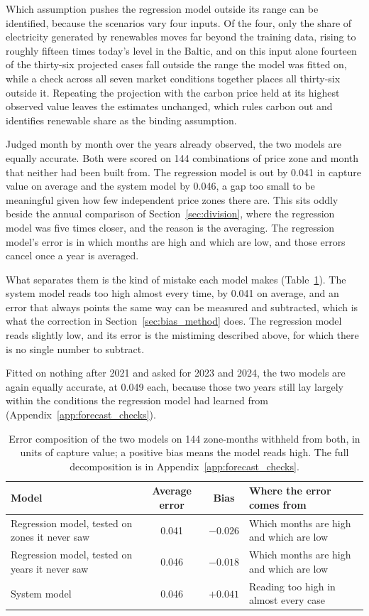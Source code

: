 Which assumption pushes the regression model outside its range can be
identified, because the scenarios vary four inputs. Of the four, only the
share of electricity generated by renewables moves far beyond the training
data, rising to roughly fifteen times today's level in the Baltic, and on this
input alone fourteen of the thirty-six projected cases fall outside the range
the model was fitted on, while a check across all seven market conditions
together places all thirty-six outside it. Repeating the projection with the
carbon price held at its highest observed value leaves the estimates
unchanged, which rules carbon out and identifies renewable share as the
binding assumption\label{sec:two_estimators}.

Judged month by month over the years already observed, the two models are
equally accurate. Both were scored on 144 combinations of price zone and month
that neither had been built from. The regression model is out by 0.041 in
capture value on average and the system model by 0.046, a gap too small to be
meaningful given how few independent price zones there are. This sits
oddly beside the annual comparison of Section~\ref{sec:division}, where the
regression model was five times closer, and the reason is the averaging. The
regression model's error is in which months are high and which are low, and
those errors cancel once a year is averaged.

What separates them is the kind of mistake each model makes
(Table~\ref{tab:skill}). The system model reads too high almost every time, by
0.041 on average, and an error that always points the same way can be measured
and subtracted, which is what the correction in Section~\ref{sec:bias_method}
does. The regression model reads slightly low, and its error is the mistiming
described above, for which there is no single number to subtract.

Fitted on nothing after 2021 and asked for 2023 and 2024, the two models are
again equally accurate, at 0.049 each, because those two years still lay largely
within the conditions the regression model had learned from
(Appendix~\ref{app:forecast_checks})\label{sec:backtest}.

\begin{table}[!htb]
\centering\small
\caption{Error composition of the two models on 144 zone-months withheld from
both, in units of capture value; a positive bias means the model reads high.
The full decomposition is in Appendix~\ref{app:forecast_checks}.}
\label{tab:skill}
\begin{tabular}{l c c l}
\toprule
\textbf{Model} & \textbf{Average error} & \textbf{Bias} &
\textbf{Where the error comes from} \\
\midrule
Regression model, tested on zones it never saw & 0.041 & $-0.026$ &
Which months are high and which are low \\
Regression model, tested on years it never saw & 0.046 & $-0.018$ &
Which months are high and which are low \\
System model & 0.046 & $+0.041$ & Reading too high in almost every case \\
\bottomrule
\end{tabular}
\end{table}
\FloatBarrier

